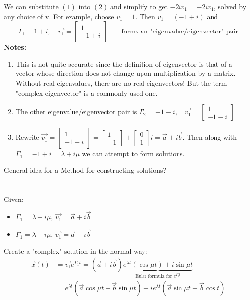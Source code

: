 We can substitute $(1)$ into $(2)$ and simplify to get $-2iv_1 = -2iv_1$, solved by any choice of v. For example, choose $v_1 = 1$. Then $v_1 = (-1+i)$ and 
\begin{equation*}
	\Gamma_1 -1 + i, \quad \vec{v_1} = \begin{bmatrix}
		1\\
		-1 + i
	\end{bmatrix} \quad \quad \text{forms an "eigenvalue/eigenvector" pair}
\end{equation*}
\textbf{Notes:}
\begin{enumerate}[label=\protect\circled{\arabic*}]
	\item This is not quite accurate since the definition of eigenvector is that of a vector whose direction does not change upon multiplication by a matrix. Without real eigenvalues, there are no real eigenvectors! But the term "complex eigenvector" is a commonly used one. 
	\item The other eigenvalue/eigenvector pair is $\Gamma_2 = -1 -i, \quad \vec{v_1} = \begin{bmatrix}
		1\\
		-1 - i
	\end{bmatrix}$
	\item Rewrite $\vec{v_1} = \begin{bmatrix}
		1\\
		-1 + i
	\end{bmatrix} = \begin{bmatrix}
		1\\-1
	\end{bmatrix} + \begin{bmatrix}
		0\\1
	\end{bmatrix}i = \vec{a} + i\vec{b}$. Then along with $\Gamma_1 = -1 + i = \lambda + i \mu$ we can attempt to form solutions.
\end{enumerate}
General idea for a Method for constructing solutions?\\
\redhline\\\\
Given:
\begin{itemize}
	\item $\Gamma_1 = \lambda + i \mu$, $\vec{v_1} = \vec{a} + i \vec{b}$
	\item $\Gamma_1 = \lambda - i \mu$, $\vec{v_1} = \vec{a} - i \vec{b}$
\end{itemize}
Create a "complex" solution in the normal way:
\begin{align*}
	\vec{x}(t) & = \vec{v_1}e^{\Gamma_1 t} = (\vec{a} + i\vec{b}) \underbrace{e^{\lambda t}(\cos \mu t) + i \sin \mu t}_{\text{Euler formula for } e^{\Gamma_1 t}}\\
	& = e^{\lambda t}(\vec{a} \cos \mu t - \vec{b} \sin \mu t) + ie^{\lambda t}(\vec{a}\sin \mu t + \vec{b} \cos t)
\end{align*}
